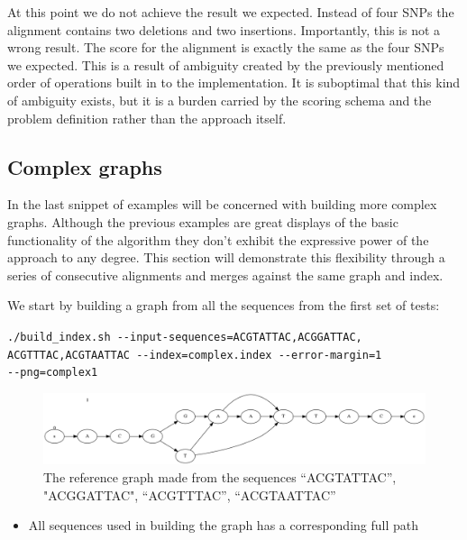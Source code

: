 \documentclass[thesis.tex]{subfiles}
\begin{document}
\noindent
At this point we do not achieve the result we expected. Instead of four SNPs the alignment contains two deletions and two insertions. Importantly, this is not a wrong result. The score for the alignment is exactly the same as the four SNPs we expected. This is a result of ambiguity created by the previously mentioned order of operations built in to the implementation. It is suboptimal that this kind of ambiguity exists, but it is a burden carried by the scoring schema and the problem definition rather than the approach itself.
\subsection*{Complex graphs}
In the last snippet of examples will be concerned with building more complex graphs. Although the previous examples are great displays of the basic functionality of the algorithm they don't exhibit the expressive power of the approach to any degree. This section will demonstrate this flexibility through a series of consecutive alignments and merges against the same graph and index.\\
\par\noindent
We start by building a graph from all the sequences from the first set of tests:\\
\par\noindent
\texttt{./build\_index.sh -{}-input-sequences=ACGTATTAC,ACGGATTAC,\\ACGTTTAC,ACGTAATTAC -{}-index=complex.index -{}-error-margin=1 \\-{}-png=complex1}\\
\par\noindent
\begin{figure}[H]
  \begin{mdframed}
  \includegraphics[width=\textwidth]{output/complex.png}
  \caption[A complex reference graph]{The reference graph made from the sequences ``ACGTATTAC'', "ACGGATTAC", ``ACGTTTAC'', ``ACGTAATTAC''}
  \label{fig:validation_complex_ref}
  \end{mdframed}
\end{figure}
\begin{itemize}
  \item All sequences used in building the graph has a corresponding full path
\end{itemize}
\end{document}
